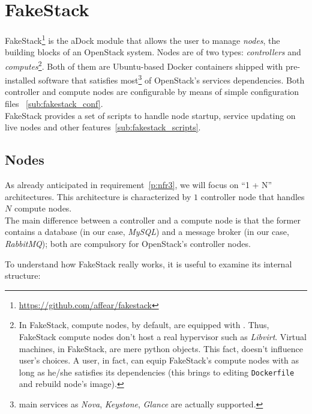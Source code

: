 \section{FakeStack}
\label{sec:fakestack}
FakeStack\footnote{\url{https://github.com/affear/fakestack}} is the aDock module that allows the user to manage \textit{nodes}, the building blocks of an OpenStack system. Nodes are of two types: \textit{controllers} and \textit{computes}\footnote{In FakeStack, compute nodes, by default, are equipped with . Thus, FakeStack compute nodes don't host a real hypervisor such as \textit{Libvirt}. Virtual machines, in FakeStack, are mere python objects. This fact, doesn't influence user's choices. A user, in fact, can equip FakeStack's compute nodes with  as long as he/she satisfies its dependencies (this brings to editing \texttt{Dockerfile} and rebuild node's image).}. Both of them are Ubuntu-based Docker containers shipped with pre-installed software that satisfies most\footnote{main services as \textit{Nova}, \textit{Keystone}, \textit{Glance} are actually supported.} of OpenStack's services dependencies. Both controller and compute nodes are configurable by means of simple configuration files ~\ref{sub:fakestack_conf}.\\
FakeStack provides a set of scripts to handle node startup, service updating on live nodes and other features~\ref{sub:fakestack_scripts}.

\subsection{Nodes}
\label{sub:fakestack_nodes}
As already anticipated in requirement~\ref{p:nfr3}, we will focus on ``1 + N'' architectures. This architecture is characterized by $1$ controller node that handles $N$ compute nodes.\\
The main difference between a controller and a compute node is that the former contains a database (in our case, \textit{MySQL}) and a message broker (in our case, \textit{RabbitMQ}); both are compulsory for OpenStack's controller nodes.

To understand how FakeStack really works, it is useful to examine its internal structure:


